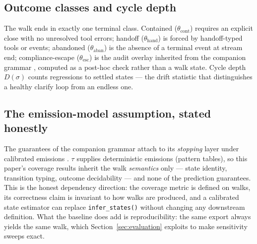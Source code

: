 \subsection{Outcome classes and cycle depth}
The walk ends in exactly one terminal class.
Contained ($\theta_{\mathrm{cont}}$) requires an explicit close with no unresolved tool
errors; handoff ($\theta_{\mathrm{hand}}$) is forced by handoff-typed tools or events;
abandoned ($\theta_{\mathrm{aban}}$) is the absence of a terminal event at stream end;
compliance-escape ($\theta_{\mathrm{esc}}$) is the audit overlay inherited from the companion
grammar \citep{garcia2026grammar}, computed as a post-hoc check rather than a walk state.
Cycle depth $D(\sigma)$ counts regressions to settled states --- the drift statistic that
distinguishes a healthy clarify loop from an endless one.

\subsection{The emission-model assumption, stated honestly}
The guarantees of the companion grammar attach to its \emph{stopping} layer under calibrated
emissions \citep{garcia2026grammar}.
$\tau$ supplies deterministic emissions (pattern tables), so this paper's coverage results
inherit the walk \emph{semantics} only --- state identity, transition typing, outcome
decidability --- and none of the prediction guarantees.
This is the honest dependency direction: the coverage metric is defined on walks, its
correctness claim is invariant to how walks are produced, and a calibrated state estimator
can replace \texttt{infer\_states()} without changing any downstream definition.
What the baseline does add is reproducibility: the same export always yields the same walk,
which Section~\ref{sec:evaluation} exploits to make sensitivity sweeps exact.
